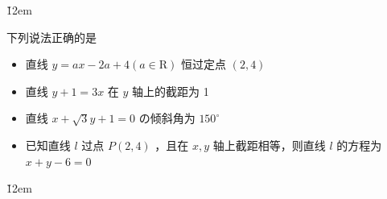 \v{12em}

\begin{example}
    下列说法正确的是
    \begin{itemize}
        \item[（1）] 直线 $y=a x-2 a+4(a \in \mathrm{R})$ 恒过定点 $(2,4)$
        \item[（2）] 直线 $y+1=3 x$ 在 $y$ 轴上的截距为 1
        \item[（3）] 直线 $x+\sqrt{3} y+1=0$ の倾斜角为 $150^{\circ}$
        \item[（4）] 已知直线 $l$ 过点 $P(2,4)$ ，且在 $x, y$ 轴上截距相等，则直线 $l$ 的方程为 $x+y-6=0$
    \end{itemize}
\end{example}

\v{12em}
